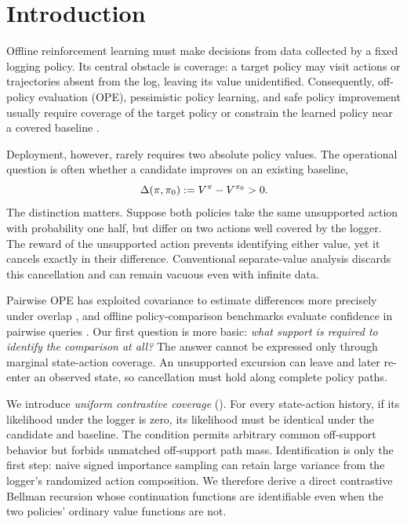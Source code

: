 \section{Introduction}

Offline reinforcement learning must make decisions from data collected by a fixed logging policy. Its central obstacle is coverage: a target policy may visit actions or trajectories absent from the log, leaving its value unidentified. Consequently, off-policy evaluation (OPE), pessimistic policy learning, and safe policy improvement usually require coverage of the target policy or constrain the learned policy near a covered baseline \citep{precup2000eligibility,thomas2015high,laroche2019safe,rashidinejad2021bridging,xie2021bellman}.

Deployment, however, rarely requires two absolute policy values. The operational question is often whether a candidate improves on an existing baseline,
\begin{equation}
\Delta(\pi,\pi_0) := V^\pi-V^{\pi_0}>0.
\label{eq:contrast}
\end{equation}
The distinction matters. Suppose both policies take the same unsupported action with probability one half, but differ on two actions well covered by the logger. The reward of the unsupported action prevents identifying either value, yet it cancels exactly in their difference. Conventional separate-value analysis discards this cancellation and can remain vacuous even with infinite data.

Pairwise OPE has exploited covariance to estimate differences more precisely under overlap \citep{jeunen2024delta}, and offline policy-comparison benchmarks evaluate confidence in pairwise queries \citep{koul2022offline}. Our first question is more basic: \emph{what support is required to identify the comparison at all?} The answer cannot be expressed only through marginal state-action coverage. An unsupported excursion can leave and later re-enter an observed state, so cancellation must hold along complete policy paths.

We introduce \emph{uniform contrastive coverage} (\UCC). For every state-action history, if its likelihood under the logger is zero, its likelihood must be identical under the candidate and baseline. The condition permits arbitrary common off-support behavior but forbids unmatched off-support path mass. Identification is only the first step: naive signed importance sampling can retain large variance from the logger's randomized action composition. We therefore derive a direct contrastive Bellman recursion whose continuation functions are identifiable even when the two policies' ordinary value functions are not.

